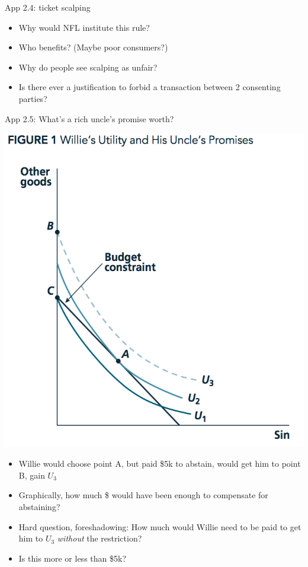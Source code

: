 \documentclass[table]{beamer}
\begin{document}
\begin{frame}{App 2.4: ticket scalping}
\begin{itemize}
  \begin{itemize}
  \item
    Why would NFL institute this rule?
  \item
    Who benefits? (Maybe poor consumers?)
  \item
    Why do people see scalping as unfair?
  \item
    Is there ever a justification to forbid a transaction between 2
    consenting parties?
  \end{itemize}
\end{itemize}

\begin{block}{App 2.5: What's a rich uncle's promise worth?}

\includegraphics{picsfigs/williesuncle.png}\\

\begin{itemize}
\item
  Willie would choose point A, but paid \$5k to abstain, would get him
  to point B, gain \(U_3\)
\item
  Graphically, how much \$ would have been enough to compensate for
  abstaining?
\item
  Hard question, foreshadowing: How much would Willie need to be paid to
  get him to \(U_3\) \emph{without} the restriction?
\item
  Is this more or less than \$5k?
\end{itemize}

\end{block}

\end{frame}
\end{document}
